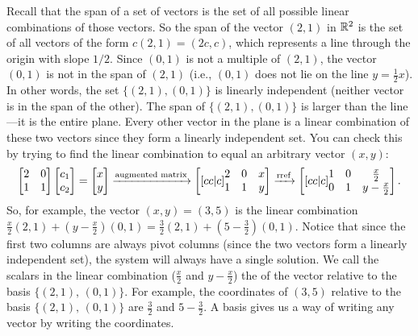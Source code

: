 \begin{example}
Recall that the span of a set of vectors is the set of all possible linear combinations of those vectors.  So the span of the vector $(2,1)$ in $\mathbb{R}^2$ is the set of all vectors of the form $c(2,1)=(2c,c)$, which represents a line through the origin with slope $1/2$.  Since $(0,1)$ is not a multiple of $(2,1)$, the vector $(0,1)$ is not in the span of $(2,1)$ (i.e., $(0,1)$ does not lie on the line $y=\frac{1}{2}x$).  In other words, the set $\{(2,1),(0,1)\}$ is linearly independent (neither vector is in the span of the other).  The span of $\{(2,1),(0,1)\}$ is larger than the line---it is the entire plane. Every other vector in the plane is a linear combination of these two vectors since they form a linearly independent set. You can check this by trying to find the linear combination to equal an arbitrary vector $(x,y)$:
\begin{equation*}
\begin{bmatrix}
\begin{matrix} 2\\1 \end{matrix}&
\begin{matrix} 0\\1 \end{matrix}
\end{bmatrix}
\begin{bmatrix}c_1\\c_2\end{bmatrix}
=\begin{bmatrix}x\\y\end{bmatrix}
\xrightarrow{\text{augmented matrix}}
\begin{bmatrix}[cc|c]
\begin{matrix} 2\\1 \end{matrix}&
\begin{matrix} 0\\1 \end{matrix}&
\begin{matrix} x\\y \end{matrix}
\end{bmatrix}
\xrightarrow{\operatorname{rref}}
\begin{bmatrix}[cc|c]
\begin{matrix} 1\\0 \end{matrix}&
\begin{matrix} 0\\1 \end{matrix}&
\begin{matrix} \frac{x}{2}\\{y-\frac{x}{2}} \end{matrix}
\end{bmatrix}.
\end{equation*}
So, for example, the vector $(x,y)=(3,5)$ is the linear combination $\frac{x}{2}(2,1)+(y-\frac{x}{2})(0,1)=\frac{3}{2}(2,1)+(5-\frac{3}{2})(0,1)$.
Notice that since the first two columns are always pivot columns (since the two vectors form a linearly independent set), the system will always have a single solution. We call the scalars in the linear combination ($\frac{x}{2}$ and $y-\frac{x}{2}$) the  of the vector relative to the basis $\{(2,1),\, (0,1)\}$. For example, the coordinates of $(3,5)$ relative to the basis $\{(2,1),\, (0,1)\}$ are $\frac{3}{2}$ and $5-\frac{3}{2}$.  A basis gives us a way of writing any vector by writing the coordinates.


\end{example}
